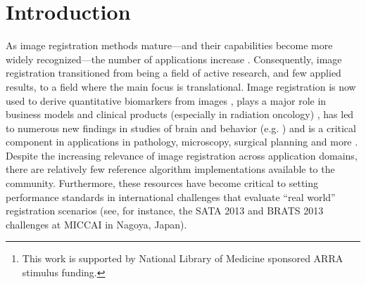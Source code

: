 \documentclass{frontiersSCNS}
\newcommand{\tk}{~ITK$^{\text{4}}$~}
\begin{document}
\begin{abstract}
Publicly available scientific resources help establish evaluation
standards, provide a platform for teaching and improve
reproducibility.  Version 4 of the Insight ToolKit (\tk) seeks to
establish new standards in publicly available image registration
methodology.  \tk makes several advances in comparison to previous
versions of ITK.  \tk supports both multivariate images and objective
functions; it also unifies high-dimensional (deformation field) and
low-dimensional (affine) transformations with metrics that are
reusable across transform types and with composite transforms that
allow arbitrary series of geometric mappings to be chained together
seamlessly.  Metrics and optimizers take advantage of multi-core
resources, when available.  Furthermore, \tk reduces the
parameter optimization burden via principled heuristics 
that automatically set scaling across disparate parameter types
(rotations versus translations).  A related approach also constrains
steps sizes for gradient-based optimizers.  The result is that tuning for different metrics and/or image
pairs is rarely necessary allowing the researcher to more easily focus
on design/comparison of registration strategies.  In total, the \tk contribution is intended as a structure to
support reproducible research practices, will provide a more extensive
foundation against which to evaluate new work in image registration
and also enable application level programmers a broad suite of tools
on which to build. \footnote{This work is supported by National
Library of Medicine sponsored ARRA stimulus funding.}
\end{abstract}

\section{Introduction}
As image registration methods mature---and their capabilities become
more widely recognized---the number of applications increase
\cite{Rueckert1999,2004,Shelton2005,Miller2005,Chen2008,Cheung2009,Baloch2009,Peyrat2010,Metz2011,Kikinis2011,Fedorov2011,Murphy2011}.
Consequently, image registration transitioned from being a field of active research, and few applied results, to a
field where the main focus is translational.  Image registration is
now used to derive quantitative biomarkers from images
\cite{Jack2010a}, plays a major role in business models and clinical
products (especially in radiation oncology) \cite{Cheung2009}, has led
to numerous new findings in studies of brain and behavior (e.g. \cite{Bearden2007}) and is a critical component in applications in
pathology, microscopy, surgical planning and more
\cite{Shelton2005,Miller2005,Floca2007,Chen2008,Cheung2009,Peyrat2010,Kikinis2011,Murphy2011}.
Despite the increasing relevance of image registration across
application domains, there are relatively few reference algorithm
implementations available to the community.  Furthermore, these
resources have become critical to setting performance standards in
international challenges that evaluate ``real world'' registration
scenarios (see, for instance, the SATA 2013 and BRATS 2013 challenges
at MICCAI in Nagoya, Japan). 
\end{document}
